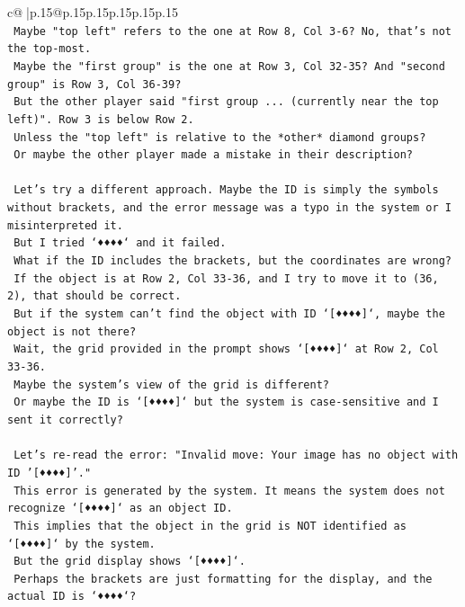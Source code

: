 \documentclass{article}
\begin{document}
{\begin{supertabular}{c@{$\;$}|p{.15\linewidth}@{}p{.15\linewidth}p{.15\linewidth}p{.15\linewidth}p{.15\linewidth}p{.15\linewidth}}
{{{\\ 
\texttt{    Maybe "top left" refers to the one at Row 8, Col 3{-}6? No, that's not the top{-}most.} \\
\texttt{    Maybe the "first group" is the one at Row 3, Col 32{-}35? And "second group" is Row 3, Col 36{-}39?} \\
\texttt{    But the other player said "first group ... (currently near the top left)". Row 3 is below Row 2.} \\
\texttt{    Unless the "top left" is relative to the *other* diamond groups?} \\
\texttt{    Or maybe the other player made a mistake in their description?} \\
\\ 
\texttt{    Let's try a different approach. Maybe the ID is simply the symbols without brackets, and the error message was a typo in the system or I misinterpreted it.} \\
\texttt{    But I tried `♦♦♦♦` and it failed.} \\
\texttt{    What if the ID includes the brackets, but the coordinates are wrong?} \\
\texttt{    If the object is at Row 2, Col 33{-}36, and I try to move it to (36, 2), that should be correct.} \\
\texttt{    But if the system can't find the object with ID `{[}♦♦♦♦{]}`, maybe the object is not there?} \\
\texttt{    Wait, the grid provided in the prompt shows `{[}♦♦♦♦{]}` at Row 2, Col 33{-}36.} \\
\texttt{    Maybe the system's view of the grid is different?} \\
\texttt{    Or maybe the ID is `{[}♦♦♦♦{]}` but the system is case{-}sensitive and I sent it correctly?} \\
\\ 
\texttt{    Let's re{-}read the error: "Invalid move: Your image has no object with ID '{[}♦♦♦♦{]}'."} \\
\texttt{    This error is generated by the system. It means the system does not recognize `{[}♦♦♦♦{]}` as an object ID.} \\
\texttt{    This implies that the object in the grid is NOT identified as `{[}♦♦♦♦{]}` by the system.} \\
\texttt{    But the grid display shows `{[}♦♦♦♦{]}`.} \\
\texttt{    Perhaps the brackets are just formatting for the display, and the actual ID is `♦♦♦♦`?} \\
}}}
\end{supertabular}}
\end{document}
